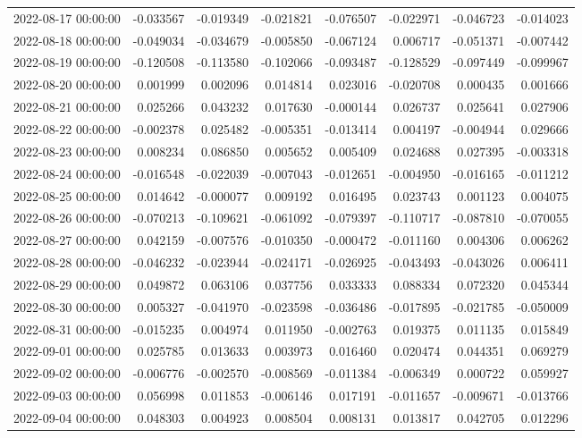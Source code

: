 \begin{tabular}{lrrrrrrr}
2022-08-17 00:00:00 & -0.033567 & -0.019349 & -0.021821 & -0.076507 & -0.022971 & -0.046723 & -0.014023 \\
2022-08-18 00:00:00 & -0.049034 & -0.034679 & -0.005850 & -0.067124 & 0.006717 & -0.051371 & -0.007442 \\
2022-08-19 00:00:00 & -0.120508 & -0.113580 & -0.102066 & -0.093487 & -0.128529 & -0.097449 & -0.099967 \\
2022-08-20 00:00:00 & 0.001999 & 0.002096 & 0.014814 & 0.023016 & -0.020708 & 0.000435 & 0.001666 \\
2022-08-21 00:00:00 & 0.025266 & 0.043232 & 0.017630 & -0.000144 & 0.026737 & 0.025641 & 0.027906 \\
2022-08-22 00:00:00 & -0.002378 & 0.025482 & -0.005351 & -0.013414 & 0.004197 & -0.004944 & 0.029666 \\
2022-08-23 00:00:00 & 0.008234 & 0.086850 & 0.005652 & 0.005409 & 0.024688 & 0.027395 & -0.003318 \\
2022-08-24 00:00:00 & -0.016548 & -0.022039 & -0.007043 & -0.012651 & -0.004950 & -0.016165 & -0.011212 \\
2022-08-25 00:00:00 & 0.014642 & -0.000077 & 0.009192 & 0.016495 & 0.023743 & 0.001123 & 0.004075 \\
2022-08-26 00:00:00 & -0.070213 & -0.109621 & -0.061092 & -0.079397 & -0.110717 & -0.087810 & -0.070055 \\
2022-08-27 00:00:00 & 0.042159 & -0.007576 & -0.010350 & -0.000472 & -0.011160 & 0.004306 & 0.006262 \\
2022-08-28 00:00:00 & -0.046232 & -0.023944 & -0.024171 & -0.026925 & -0.043493 & -0.043026 & 0.006411 \\
2022-08-29 00:00:00 & 0.049872 & 0.063106 & 0.037756 & 0.033333 & 0.088334 & 0.072320 & 0.045344 \\
2022-08-30 00:00:00 & 0.005327 & -0.041970 & -0.023598 & -0.036486 & -0.017895 & -0.021785 & -0.050009 \\
2022-08-31 00:00:00 & -0.015235 & 0.004974 & 0.011950 & -0.002763 & 0.019375 & 0.011135 & 0.015849 \\
2022-09-01 00:00:00 & 0.025785 & 0.013633 & 0.003973 & 0.016460 & 0.020474 & 0.044351 & 0.069279 \\
2022-09-02 00:00:00 & -0.006776 & -0.002570 & -0.008569 & -0.011384 & -0.006349 & 0.000722 & 0.059927 \\
2022-09-03 00:00:00 & 0.056998 & 0.011853 & -0.006146 & 0.017191 & -0.011657 & -0.009671 & -0.013766 \\
2022-09-04 00:00:00 & 0.048303 & 0.004923 & 0.008504 & 0.008131 & 0.013817 & 0.042705 & 0.012296 \\

\end{tabular}
